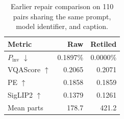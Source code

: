\begin{table}[t]
\centering
\small
\begin{tabular}{lrr}
\toprule
Metric & Raw & Retiled \\
\midrule
$P_{\mathrm{inv}}$ $\downarrow$ & 0.1897\% & 0.0000\% \\
VQAScore $\uparrow$ & 0.2065 & 0.2071 \\
PE $\uparrow$ & 0.1858 & 0.1859 \\
SigLIP2 $\uparrow$ & 0.1379 & 0.1261 \\
Mean parts & 178.7 & 421.2 \\
\bottomrule
\end{tabular}
\caption{Earlier repair comparison on 110 pairs sharing the same prompt, model identifier, and caption.}
\label{tab:raw-retiled}
\end{table}
